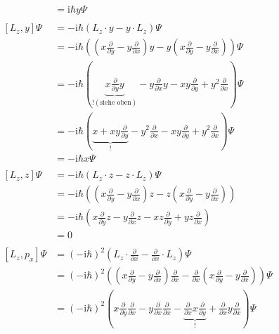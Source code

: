 \begin{align*}
        &= \text{i}\hbar y\Psi\\
        \\
        \left[ L_z,y \right]\Psi &= -\text{i}\hbar \left( L_z\cdot y - y \cdot L_z \right) \Psi\\
        &= -\text{i}\hbar \left( \left( x\frac{\partial}{\partial y} - y\frac{\partial}{\partial x} \right)y - y\left( x\frac{\partial}{\partial y} - y\frac{\partial}{\partial x} \right) \right)\Psi\\
        &= -\text{i}\hbar \left( \underbrace{x\frac{\partial}{\partial y}y}_{! (\text{siehe oben})} - y\frac{\partial}{\partial x}y - xy\frac{\partial}{\partial y} + y^2\frac{\partial}{\partial x} \right)\Psi\\
        &= -\text{i}\hbar \left( \underbrace{x + xy\frac{\partial}{\partial y}}_{!} - y^2\frac{\partial}{\partial x} - xy\frac{\partial}{\partial y} + y^2\frac{\partial}{\partial x} \right)\Psi\\
        &= -\text{i}\hbar x\Psi\\
        \\
        \left[ L_z,z \right]\Psi &= -\text{i}\hbar \left( L_z\cdot z - z \cdot L_z \right) \Psi\\
        &= -\text{i}\hbar \left( \left( x\frac{\partial}{\partial y} - y\frac{\partial}{\partial x} \right)z - z\left( x\frac{\partial}{\partial y} - y\frac{\partial}{\partial x} \right) \right)\\
        &= -\text{i}\hbar \left( x\frac{\partial}{\partial y}z - y\frac{\partial}{\partial x}z - xz\frac{\partial}{\partial y} + yz\frac{\partial}{\partial x} \right)\\
        &= 0\\
        \\
        \left[ L_z,p_x \right]\Psi &= \left( -\text{i}\hbar \right)^2 \left(L_z\cdot \frac{\partial}{\partial x} - \frac{\partial}{\partial x} \cdot L_z\right)\Psi\\
        &= \left( -\text{i}\hbar \right)^2 \left( \left( x\frac{\partial}{\partial y} - y\frac{\partial}{\partial x} \right) \frac{\partial}{\partial x} -\frac{\partial}{\partial x} \left( x\frac{\partial}{\partial y} - y\frac{\partial}{\partial x} \right) \right)\Psi\\
        &= \left( -\text{i}\hbar \right)^2 \left( x\frac{\partial}{\partial y}\frac{\partial}{\partial x} - y\frac{\partial}{\partial x}\frac{\partial}{\partial x} - \underbrace{\frac{\partial}{\partial x}x \frac{\partial}{\partial y}}_{!} + \frac{\partial}{\partial x}y \frac{\partial}{\partial x} \right)\Psi\\

\end{align*}
